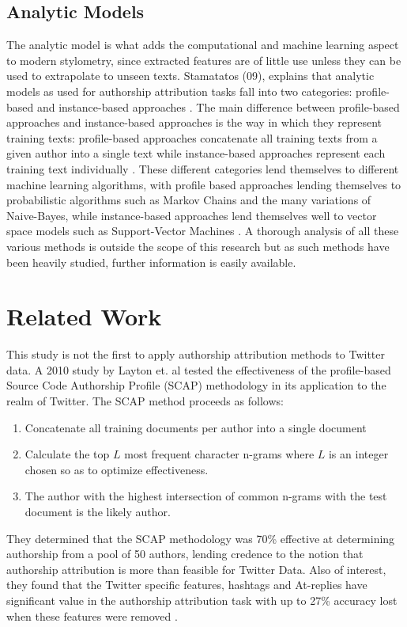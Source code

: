 \documentclass[pageno]{jpaper}
\begin{document}
\subsection{Analytic Models}
\label{sec:analysticModels}
The analytic model is what adds the computational and machine learning aspect to modern stylometry, since extracted features are of little use unless they can be used to extrapolate to unseen texts.  Stamatatos (09), explains that analytic models as used for authorship attribution tasks fall into two categories: profile-based and instance-based approaches \cite{survey}.  The main difference between profile-based approaches and instance-based approaches is the way in which they represent training texts: profile-based approaches concatenate all training texts from a given author into a single text while instance-based approaches represent each training text individually \cite{survey}.  These different categories lend themselves to different machine learning algorithms, with profile based approaches lending themselves to probabilistic algorithms such as Markov Chains and the many variations of Naive-Bayes, while instance-based approaches
lend themselves well to vector space models such as Support-Vector Machines \cite{survey}.  A thorough analysis of all these various methods is outside the scope of this research but as such methods have been heavily studied, further information is easily available.

\section{Related Work}
\label{sec:relatedWork}
This study is not the first to apply authorship attribution methods to Twitter data.  A 2010 study by Layton et. al tested the effectiveness of the profile-based Source Code Authorship Profile (SCAP) methodology in its application to the realm of Twitter.  The SCAP method proceeds as follows:
\begin{enumerate}
\item{Concatenate all training documents per author into a single document}
\item{Calculate the top $L$ most frequent character n-grams where $L$ is an integer chosen so as to optimize effectiveness.}
\item{The author with the highest intersection of common n-grams with the test document is the likely author.}
\end{enumerate}
They determined that the SCAP methodology was 70\% effective at determining authorship from a pool of 50 authors, lending credence to the notion that authorship attribution is more than feasible for Twitter Data.  Also of interest, they found that the Twitter specific features, hashtags and At-replies have significant value in the authorship attribution task with up to 27\% accuracy lost when these features were removed \cite{140}.
\end{document}

